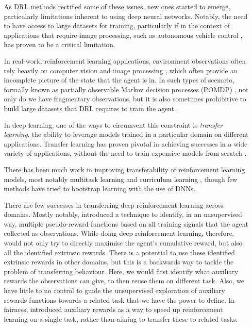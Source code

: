 As DRL methods rectified some of these issues, new ones started to emerge, particularly limitations inherent to using deep neural networks. Notably, the need to have access to large datasets for training, particularly if in the context of applications that require image processing, such as autonomous vehicle control \parencite{krizhevsky2012imagenet}, has proven to be a critical limitation. 

In real-world reinforcement learning applications, environment observations often rely heavily on computer vision and image processing \parencite{berns1992reinforcement}, which often provide an incomplete picture of the state that the agent is in. In such types of scenario, formally known as partially observable Markov decision processes (POMDP) \parencite{monahan1982state}, not only do we have fragmentary observations, but it is also sometimes prohibitive to build large datasets that DRL requires to train the agent.

In deep learning, one of the ways to circumvent this constraint is \emph{transfer learning}, the ability to leverage models trained in a particular domain on different applications. Transfer learning has proven pivotal in achieving successes in a wide variety of applications, without the need to train expensive models from scratch \parencite{pan2010survey}.

There has been much work in improving transferability of reinforcement learning models, most notably multitask learning \parencite{caruana1998multitask} and curriculum learning \parencite{bengio2009curriculum}, though few methods have tried to bootstrap learning with the use of DNNs.

There are few successes in transferring deep reinforcement learning across domains. Mostly notably, \cite{jaderberg2016reinforcement} introduced a technique to identify, in an unsupervised way, multiple pseudo-reward functions based on all training signals that the agent collected as observations. While doing deep reinforcement learning, therefore, \citeauthor{jaderberg2016reinforcement} would not only try to directly maximise the agent's cumulative reward, but also all the identified extrinsic rewards. There is a potential to use these identified extrinsic rewards in other domains, but this is a backwards way to tackle the problem of transferring behaviour. Here, we would first identify what auxiliary rewards the observations can give, to then reuse them on different task. Also, we have little to no control to guide the unsupervised exploration of auxiliary rewards functions towards a related task that we have the power to define. In fairness, \citeauthor{jaderberg2016reinforcement} introduced auxiliary rewards as a way to speed up reinforcement learning on a single task, rather than aiming to transfer these to related tasks.

